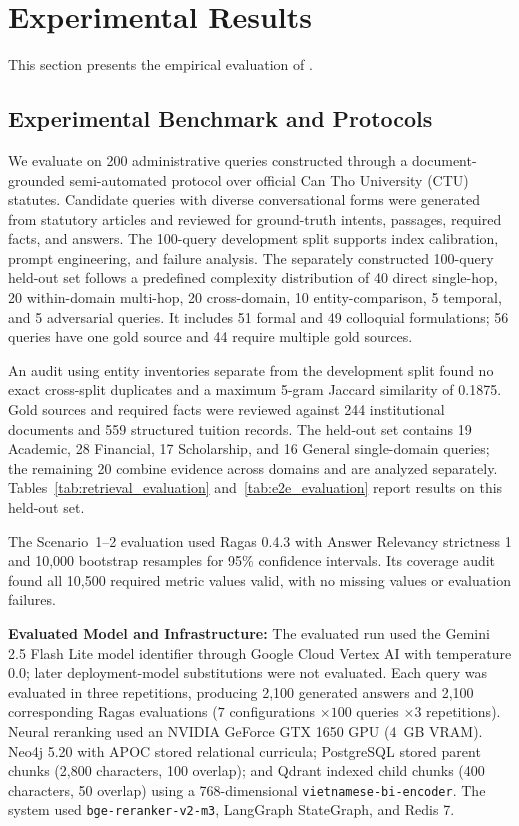 \section{Experimental Results}
\label{sec:exp}

This section presents the empirical evaluation of \system{}.

\subsection{Experimental Benchmark and Protocols}
\label{sec:dataset}

We evaluate \system{} on 200 administrative queries constructed through a document-grounded semi-automated protocol over official Can Tho University (CTU) statutes. Candidate queries with diverse conversational forms were generated from statutory articles and reviewed for ground-truth intents, passages, required facts, and answers. The 100-query development split supports index calibration, prompt engineering, and failure analysis. The separately constructed 100-query held-out set follows a predefined complexity distribution of 40 direct single-hop, 20 within-domain multi-hop, 20 cross-domain, 10 entity-comparison, 5 temporal, and 5 adversarial queries. It includes 51 formal and 49 colloquial formulations; 56 queries have one gold source and 44 require multiple gold sources.

An audit using entity inventories separate from the development split found no exact cross-split duplicates and a maximum 5-gram Jaccard similarity of 0.1875. Gold sources and required facts were reviewed against 244 institutional documents and 559 structured tuition records. The held-out set contains 19 Academic, 28 Financial, 17 Scholarship, and 16 General single-domain queries; the remaining 20 combine evidence across domains and are analyzed separately. Tables~\ref{tab:retrieval_evaluation} and~\ref{tab:e2e_evaluation} report results on this held-out set.

The Scenario~1--2 evaluation used Ragas 0.4.3 with Answer Relevancy strictness 1 and 10,000 bootstrap resamples for 95\% confidence intervals. Its coverage audit found all 10,500 required metric values valid, with no missing values or evaluation failures.

\noindent\textbf{Evaluated Model and Infrastructure:} The evaluated run used the Gemini 2.5 Flash Lite model identifier through Google Cloud Vertex AI with temperature 0.0; later deployment-model substitutions were not evaluated. Each query was evaluated in three repetitions, producing 2,100 generated answers and 2,100 corresponding Ragas evaluations ($7$ configurations $\times 100$ queries $\times 3$ repetitions). Neural reranking used an NVIDIA GeForce GTX 1650 GPU (4~GB VRAM). Neo4j 5.20 with APOC stored relational curricula; PostgreSQL stored parent chunks (2,800 characters, 100 overlap); and Qdrant indexed child chunks (400 characters, 50 overlap) using a 768-dimensional \texttt{vietnamese-bi-encoder}. The system used \texttt{bge-reranker-v2-m3}, LangGraph StateGraph, and Redis 7.


